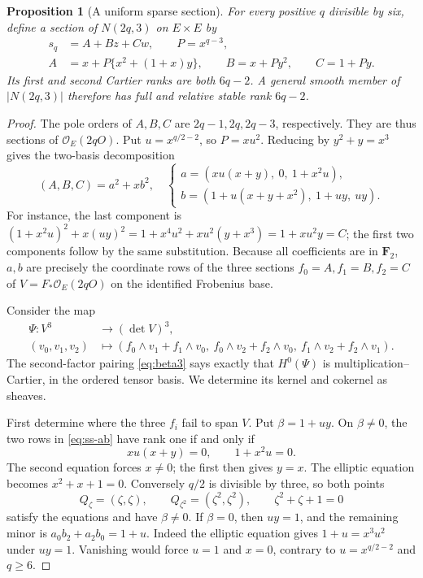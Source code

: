 \documentclass[11pt]{article}
\newtheorem{proposition}[theorem]{Proposition}
\theoremstyle{definition}\newtheorem{definition}[theorem]{Definition}
\theoremstyle{remark}\newtheorem{remark}[theorem]{Remark}
\newcommand{\OO}{\mathcal O}
\newcommand{\FF}{\mathbf F}
\begin{document}
\begin{proposition}[A uniform sparse section]\label{prop:ss-sparse}
For every positive $q$ divisible by six, define a section of $N(2q,3)$ on $E\times E$ by
\begin{align*}
 s_q&=A+Bz+Cw,\qquad P=x^{q-3},\\
 A&=x+P\{x^2+(1+x)y\},\qquad B=x+Py^2,\qquad C=1+Py.
\end{align*}
Its first and second Cartier ranks are both $6q-2$. A general smooth member of $|N(2q,3)|$ therefore has full and relative stable rank $6q-2$.
\end{proposition}
\begin{proof}
The pole orders of $A,B,C$ are $2q-1,2q,2q-3$, respectively. They are thus sections of $\OO_E(2qO)$. Put $u=x^{q/2-2}$, so $P=xu^2$. Reducing by $y^2+y=x^3$ gives the two-basis decomposition
\begin{equation}\label{eq:ss-ab}
 (A,B,C)=a^2+xb^2,
 \quad
 \begin{cases}
 a=(xu(x+y),\ 0,\ 1+x^2u),\\
 b=(1+u(x+y+x^2),\ 1+uy,\ uy).
 \end{cases}
\end{equation}
For instance, the last component is
$(1+x^2u)^2+x(uy)^2=1+x^4u^2+xu^2(y+x^3)=1+xu^2y=C$;
the first two components follow by the same substitution. Because all coefficients are in $\FF_2$, $a,b$ are precisely the coordinate rows of the three sections $f_0=A,f_1=B,f_2=C$ of $V=F_*\OO_E(2qO)$ on the identified Frobenius base.

Consider the map
\begin{align*}
 \Psi:V^3&\longrightarrow(\det V)^3,\\
 (v_0,v_1,v_2)&\longmapsto
 (f_0\wedge v_1+f_1\wedge v_0,\
  f_0\wedge v_2+f_2\wedge v_0,\
  f_1\wedge v_2+f_2\wedge v_1).
\end{align*}
The second-factor pairing \eqref{eq:beta3} says exactly that $H^0(\Psi)$ is multiplication--Cartier, in the ordered tensor basis. We determine its kernel and cokernel as sheaves.

First determine where the three $f_i$ fail to span $V$. Put $\beta=1+uy$. On $\beta\ne0$, the two rows in \eqref{eq:ss-ab} have rank one if and only if
\[
                     xu(x+y)=0,\qquad 1+x^2u=0.
\]
The second equation forces $x\ne0$; the first then gives $y=x$. The elliptic equation becomes $x^2+x+1=0$. Conversely $q/2$ is divisible by three, so both points
\[
 Q_\zeta=(\zeta,\zeta),\qquad Q_{\zeta^2}=(\zeta^2,\zeta^2),
 \qquad \zeta^2+\zeta+1=0
\]
satisfy the equations and have $\beta\ne0$. If $\beta=0$, then $uy=1$, and the remaining minor is
$a_0b_2+a_2b_0=1+u$. Indeed the elliptic equation gives $1+u=x^3u^2$ under $uy=1$. Vanishing would force $u=1$ and $x=0$, contrary to $u=x^{q/2-2}$ and $q\ge6$.


\end{proof}
\end{document}
